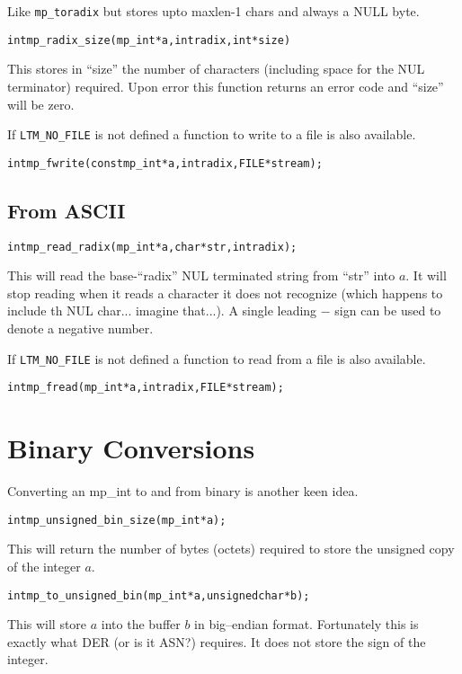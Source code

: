\documentclass[synpaper]{book}
\begin{document}
Like \texttt{mp\_toradix} but stores upto maxlen-1 chars and always a NULL byte.

\begin{alltt}
int mp_radix_size (mp_int * a, int radix, int *size)
\end{alltt}
This stores in ``size'' the number of characters (including space for the NUL terminator) required.  Upon error this
function returns an error code and ``size'' will be zero.

If \texttt{LTM\_NO\_FILE} is not defined a function to write to a file is also available.
\begin{alltt}
int mp_fwrite(const mp_int *a, int radix, FILE *stream);
\end{alltt}


\subsection{From ASCII}
\begin{alltt}
int mp_read_radix (mp_int * a, char *str, int radix);
\end{alltt}
This will read the base-``radix'' NUL terminated string from ``str'' into $a$.  It will stop reading when it reads a
character it does not recognize (which happens to include th NUL char... imagine that...).  A single leading $-$ sign
can be used to denote a negative number.

If \texttt{LTM\_NO\_FILE} is not defined a function to read from a file is also available.
\begin{alltt}
int mp_fread(mp_int *a, int radix, FILE *stream);
\end{alltt}


\section{Binary Conversions}

Converting an mp\_int to and from binary is another keen idea.

\begin{alltt}
int mp_unsigned_bin_size(mp_int *a);
\end{alltt}

This will return the number of bytes (octets) required to store the unsigned copy of the integer $a$.

\begin{alltt}
int mp_to_unsigned_bin(mp_int *a, unsigned char *b);
\end{alltt}
This will store $a$ into the buffer $b$ in big--endian format.  Fortunately this is exactly what DER (or is it ASN?)
requires.  It does not store the sign of the integer.
\end{document}

